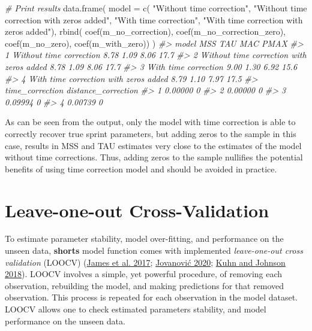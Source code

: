 \documentclass[fleqn,10pt,lineno]{wlpeerj} %
\newenvironment{Shaded}{\begin{snugshade}}{\end{snugshade}}
\newcommand{\AttributeTok}[1]{\textcolor[rgb]{0.77,0.63,0.00}{#1}}
\newcommand{\CommentTok}[1]{\textcolor[rgb]{0.56,0.35,0.01}{\textit{#1}}}
\newcommand{\FunctionTok}[1]{\textcolor[rgb]{0.00,0.00,0.00}{#1}}
\newcommand{\NormalTok}[1]{#1}
\newcommand{\StringTok}[1]{\textcolor[rgb]{0.31,0.60,0.02}{#1}}
\begin{document}
\begin{Shaded}
\begin{Highlighting}[]
\CommentTok{\# Print results}
\FunctionTok{data.frame}\NormalTok{(}
  \AttributeTok{model =} \FunctionTok{c}\NormalTok{(}
    \StringTok{"Without time correction"}\NormalTok{,}
    \StringTok{"Without time correction with zeros added"}\NormalTok{, }
    \StringTok{"With time correction"}\NormalTok{,}
    \StringTok{"With time correction with zeros added"}\NormalTok{),}
  \FunctionTok{rbind}\NormalTok{(}
    \FunctionTok{coef}\NormalTok{(m\_no\_correction),}
    \FunctionTok{coef}\NormalTok{(m\_no\_correction\_zero),}
    \FunctionTok{coef}\NormalTok{(m\_no\_zero),}
    \FunctionTok{coef}\NormalTok{(m\_with\_zero))}
\NormalTok{)}
\CommentTok{\#\textgreater{}                                      model  MSS  TAU  MAC PMAX}
\CommentTok{\#\textgreater{} 1                  Without time correction 8.78 1.09 8.06 17.7}
\CommentTok{\#\textgreater{} 2 Without time correction with zeros added 8.78 1.09 8.06 17.7}
\CommentTok{\#\textgreater{} 3                     With time correction 9.00 1.30 6.92 15.6}
\CommentTok{\#\textgreater{} 4    With time correction with zeros added 8.79 1.10 7.97 17.5}
\CommentTok{\#\textgreater{}   time\_correction distance\_correction}
\CommentTok{\#\textgreater{} 1         0.00000                   0}
\CommentTok{\#\textgreater{} 2         0.00000                   0}
\CommentTok{\#\textgreater{} 3         0.09994                   0}
\CommentTok{\#\textgreater{} 4         0.00739                   0}
\end{Highlighting}
\end{Shaded}

As can be seen from the output, only the model with time correction is able to correctly recover true sprint parameters, but adding zeros to the sample in this case, results in MSS and TAU estimates very close to the estimates of the model without time corrections. Thus, adding zeros to the sample nullifies the potential benefits of using time correction model and should be avoided in practice.

\hypertarget{leave-one-out-cross-validation}{%
\section{Leave-one-out Cross-Validation}\label{leave-one-out-cross-validation}}

To estimate parameter stability, model over-fitting, and performance on the unseen data, \textbf{shorts} model function comes with implemented \emph{leave-one-out cross validation} (LOOCV) (\protect\hyperlink{ref-jamesIntroductionStatisticalLearning2017}{James et al. 2017}; \protect\hyperlink{ref-jovanovicBmbstatsBootstrapMagnitudebased2020}{Jovanović 2020}; \protect\hyperlink{ref-kuhnAppliedPredictiveModeling2018}{Kuhn and Johnson 2018}). LOOCV involves a simple, yet powerful procedure, of removing each observation, rebuilding the model, and making predictions for that removed observation. This process is repeated for each observation in the model dataset. LOOCV allows one to check estimated parameters stability, and model performance on the unseen data.
\end{document}
